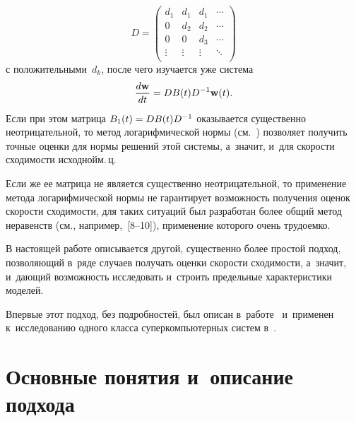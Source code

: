 \begin{multicols}{2}
\noindent
\begin{equation*}
D={ \left(
\begin{array}{cccc}
d_{1}   & d_{1}  & d_{1}   &   \cdots  \\
0       & d_{2}  & d_{2}   &   \cdots  \\
0       & 0      & d_{3}   &   \cdots  \\
\vdots  & \vdots & \vdots  &   \ddots  \\
\end{array}
\right) }
\end{equation*}
\noindent 
с положительными~$d_k$,
после чего изучается уже сис\-те\-ма 
$$
\displaystyle\frac{\displaystyle d{\mathbf w}\mathstrut}{\displaystyle dt\mathstrut}=DB(t)D^{-1}{\mathbf w}(t).
$$
%
Если при этом матрица $B_1(t)\hm=DB(t)D^{-1}$ оказывается существенно 
неотрицательной, то метод логарифмической нормы (см.~\cite{Zeifman2020porto}) 
поз\-во\-ля\-ет получить точные оценки для нормы решений этой сис\-те\-мы, а~значит, и~для 
ско\-рости схо\-ди\-мости ис\-ход\-ной\linebreak м.\,ц.

Если же ее матрица не является существенно неотрицательной, то  применение   
метода логарифмической нормы не гарантирует возможность получения оценок 
скорости сходимости, для таких ситуаций был разработан более общий метод 
неравенств (см., например,~[8--10]),
применение которого очень трудоемко.

В настоящей работе описывается другой, существенно более прос\-той подход, 
поз\-во\-ля\-ющий в~ряде случаев получать оценки ско\-рости схо\-ди\-мости, 
а~значит, и~да\-ющий воз\-мож\-ность исследовать и~строить предельные характеристики моделей.

Впервые этот подход, без подробностей, был описан в~работе~\cite{Satin2021} и~применен к~исследованию одного класса суперкомпьютерных сис\-тем в~\cite{Razumchik2022}.
        
    \section{Основные понятия и~описание подхода}
    

\end{multicols}
